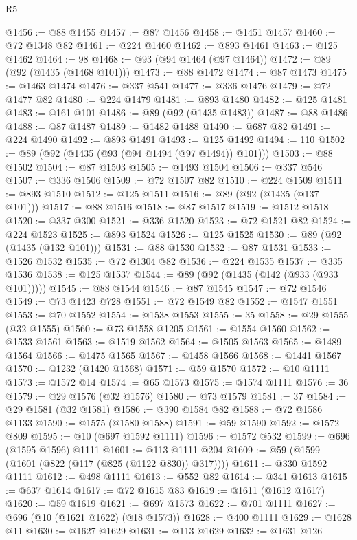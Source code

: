 \begin{lexlean}{R5}
\begin{coremodule}
{{{{{{{{{{{{{{{{{{{{{{{{{{{{{{{{{{{{{{{{{{{{{{{{{{{{{{{{{{{{{{{{{{{{{{{{{{{{{{{{{{{{{{{{{{{{@1456 := @88 @1455
@1457 := @87 @1456
@1458 := @1451 @1457
@1460 := @72 @1348 @82
@1461 := @224 @1460
@1462 := @893 @1461
@1463 := @125 @1462
@1464 := 98
@1468 := @93 (@94 @1464 (@97 @1464))
@1472 := @89 (@92 (@1435 (@1468 @101)))
@1473 := @88 @1472
@1474 := @87 @1473
@1475 := @1463 @1474
@1476 := @337 @541
@1477 := @336 @1476
@1479 := @72 @1477 @82
@1480 := @224 @1479
@1481 := @893 @1480
@1482 := @125 @1481
@1483 := @161 @101
@1486 := @89 (@92 (@1435 @1483))
@1487 := @88 @1486
@1488 := @87 @1487
@1489 := @1482 @1488
@1490 := @687 @82
@1491 := @224 @1490
@1492 := @893 @1491
@1493 := @125 @1492
@1494 := 110
@1502 := @89 (@92 (@1435 (@93 (@94 @1494 (@97 @1494)) @101)))
@1503 := @88 @1502
@1504 := @87 @1503
@1505 := @1493 @1504
@1506 := @337 @546
@1507 := @336 @1506
@1509 := @72 @1507 @82
@1510 := @224 @1509
@1511 := @893 @1510
@1512 := @125 @1511
@1516 := @89 (@92 (@1435 (@137 @101)))
@1517 := @88 @1516
@1518 := @87 @1517
@1519 := @1512 @1518
@1520 := @337 @300
@1521 := @336 @1520
@1523 := @72 @1521 @82
@1524 := @224 @1523
@1525 := @893 @1524
@1526 := @125 @1525
@1530 := @89 (@92 (@1435 (@132 @101)))
@1531 := @88 @1530
@1532 := @87 @1531
@1533 := @1526 @1532
@1535 := @72 @1304 @82
@1536 := @224 @1535
@1537 := @335 @1536
@1538 := @125 @1537
@1544 := @89 (@92 (@1435 (@142 (@933 (@933 @101)))))
@1545 := @88 @1544
@1546 := @87 @1545
@1547 := @72 @1546
@1549 := @73 @1423 @728
@1551 := @72 @1549 @82
@1552 := @1547 @1551
@1553 := @70 @1552
@1554 := @1538 @1553
@1555 := 35
@1558 := @29 @1555 (@32 @1555)
@1560 := @73 @1558 @1205
@1561 := @1554 @1560
@1562 := @1533 @1561
@1563 := @1519 @1562
@1564 := @1505 @1563
@1565 := @1489 @1564
@1566 := @1475 @1565
@1567 := @1458 @1566
@1568 := @1441 @1567
@1570 := @1232 (@1420 @1568)
@1571 := @59 @1570
@1572 := @10 @1111
@1573 := @1572 @14
@1574 := @65 @1573
@1575 := @1574 @1111
@1576 := 36
@1579 := @29 @1576 (@32 @1576)
@1580 := @73 @1579
@1581 := 37
@1584 := @29 @1581 (@32 @1581)
@1586 := @390 @1584 @82
@1588 := @72 @1586 @1133
@1590 := @1575 (@1580 @1588)
@1591 := @59 @1590
@1592 := @1572 @809
@1595 := @10 (@697 @1592 @1111)
@1596 := @1572 @532
@1599 := @696 (@1595 @1596) @1111
@1601 := @113 @1111 @204
@1609 := @59 (@1599 (@1601 (@822 (@117 (@825 (@1122 @830)) @317))))
@1611 := @330 @1592 @1111
@1612 := @498 @1111
@1613 := @552 @82
@1614 := @341 @1613
@1615 := @637 @1614
@1617 := @72 @1615 @83
@1619 := @1611 (@1612 @1617)
@1620 := @59 @1619
@1621 := @697 @1573
@1622 := @701 @1111
@1627 := @696 (@10 (@1621 @1622) (@18 @1573))
@1628 := @400 @1111
@1629 := @1628 @11
@1630 := @1627 @1629
@1631 := @113 @1629
@1632 := @1631 @126
}}}}}}}}}}}}}}}}}}}}}}}}}}}}}}}}}}}}}}}}}}}}}}}}}}}}}}}}}}}}}}}}}}}}}}}}}}}}}}}}}}}}}}}}}}}}
\end{coremodule}
\end{lexlean}
